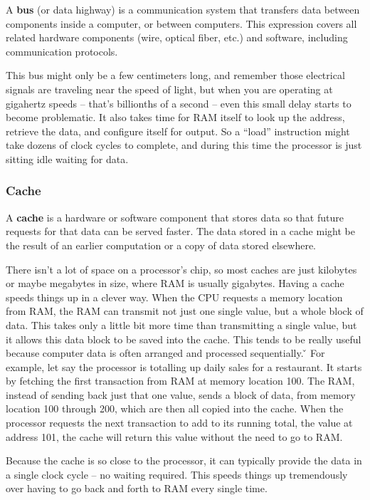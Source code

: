 \bd[Bus]
A \textbf{bus} (or data highway) is a communication system that transfers data between components inside a computer,
or between computers. This expression covers all related hardware components (wire, optical fiber, etc.) and
software, including communication protocols.
\ed

This bus might only be a few centimeters long, and remember those electrical signals are traveling near the speed of
light, but when you are operating at gigahertz speeds – that's billionths of a second – even this small delay starts
to become problematic. It also takes time for RAM itself to look up the address, retrieve the data, and configure
itself for output. So a ``load'' instruction might take dozens of clock cycles to complete, and during this
time the processor is just sitting idle waiting for data.

\subsubsection{Cache}

\bd[Cache]
A \textbf{cache} is a hardware or software component that stores data so that future requests for that data can be
served faster. The data stored in a cache might be the result of an earlier computation or a copy of data stored
elsewhere.
\ed

There isn't a lot of space on a processor's chip, so most caches are just kilobytes or maybe megabytes in size, where
RAM is usually gigabytes. Having a cache speeds things up in a clever way. When the CPU requests a memory location
from RAM, the RAM can transmit not just one single value, but a whole block of data. This takes only a little bit
more time than transmitting a single value, but it allows this data block to be saved into the cache. This tends to
be really useful because computer data is often arranged and processed sequentially. \v

\be
For example, let say the processor is totalling up daily sales for a restaurant. It starts by fetching the first
transaction from RAM at memory location 100. The RAM, instead of sending back just that one value, sends a block of
data, from memory location 100 through 200, which are then all copied into the cache. When the processor requests the
next transaction to add to its running total, the value at address 101, the cache will return this value without the
need to go to RAM\@.
\ee

Because the cache is so close to the processor, it can typically provide the data in a single clock cycle -- no
waiting required. This speeds things up tremendously over having to go back and forth to RAM every single time.

